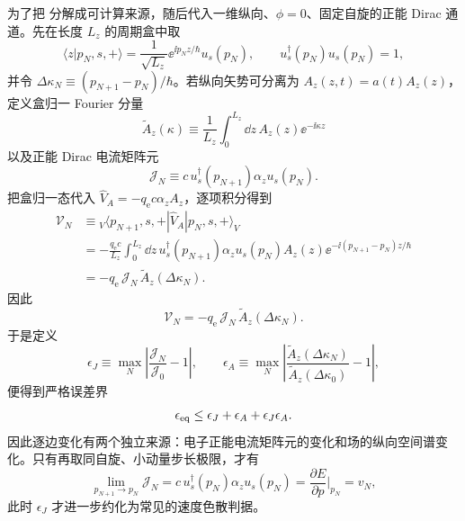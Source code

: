 为了把 分解成可计算来源，随后代入一维纵向、$\phi=0$、固定自旋的正能 Dirac 通道。先在长度 $L_z$ 的周期盒中取
\begin{equation*}
 \langle z|p_N,s,+\rangle
 =\frac{1}{\sqrt{L_z}}\ee^{\ii p_Nz/\hbar}u_s(p_N),
 \qquad u_s^\dagger(p_N)u_s(p_N)=1,
\end{equation*}
并令 $\Delta\kappa_N\equiv(p_{N+1}-p_N)/\hbar$。若纵向矢势可分离为 $A_z(z,t)=a(t)A_z(z)$，定义盒归一 Fourier 分量
\begin{equation*}
 \widetilde A_z(\kappa)
 \equiv\frac1{L_z}\int_0^{L_z}\dd z\,A_z(z)\ee^{-\ii\kappa z}
\end{equation*}
以及正能 Dirac 电流矩阵元
\begin{equation*}
 \mathcal J_N
 \equiv c\,u_s^\dagger(p_{N+1})\alpha_z u_s(p_N).
\end{equation*}
把盒归一态代入 $\hat V_A=-q_{\mathrm e} c\alpha_zA_z$，逐项积分得到
\begin{align*}
\mathcal V_N
&\equiv {}_V\!\langle p_{N+1},s,+|\hat V_A|p_N,s,+\rangle_V\\
&=-\frac{q_{\mathrm e} c}{L_z}
\int_0^{L_z}\dd z\,
 u_s^\dagger(p_{N+1})\alpha_z u_s(p_N)
 A_z(z)\ee^{-\ii(p_{N+1}-p_N)z/\hbar}\\
&=-q_{\mathrm e}\,\mathcal J_N\,\widetilde A_z(\Delta\kappa_N).
\end{align*}
因此
\begin{equation}
 {
 \mathcal V_N
 =-q_{\mathrm e}\,\mathcal J_N\,\widetilde A_z(\Delta\kappa_N).}
 \label{eq:pinem-edge-matrix-element-dirac-dp116}
\end{equation}
于是定义
\begin{equation*}
 \epsilon_J
 \equiv\max_N\left|\frac{\mathcal J_N}{\mathcal J_0}-1\right|,
 \qquad
 \epsilon_A
 \equiv\max_N\left|
 \frac{\widetilde A_z(\Delta\kappa_N)}
 {\widetilde A_z(\Delta\kappa_0)}-1\right|,
\end{equation*}
便得到严格误差界
\begin{equation}
 {
 \epsilon_{\rm eq}
 \le\epsilon_J+\epsilon_A+\epsilon_J\epsilon_A.}
 \label{eq:pinem-equal-coupling-error-dp68}
\end{equation}
因此逐边变化有两个独立来源：电子正能电流矩阵元的变化和场的纵向空间谱变化。只有再取同自旋、小动量步长极限，才有
\begin{equation*}
 \lim_{p_{N+1}\to p_N}\mathcal J_N
 =c\,u_s^\dagger(p_N)\alpha_z u_s(p_N)
 =\frac{\partial E}{\partial p}\bigg|_{p_N}
 =v_N,
\end{equation*}
此时 $\epsilon_J$ 才进一步约化为常见的速度色散判据。

